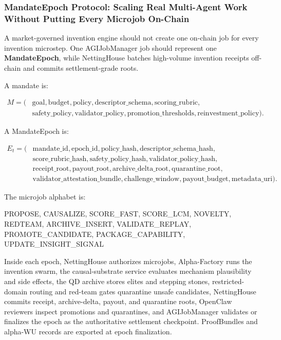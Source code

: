 \documentclass[
  11pt,
]{article}
\newenvironment{Shaded}{}{}
\newcommand{\NormalTok}[1]{#1}
\begin{document}
\subsubsection{MandateEpoch Protocol: Scaling Real Multi-Agent Work
Without Putting Every Microjob
On-Chain}\label{mandateepoch-protocol-scaling-real-multi-agent-work-without-putting-every-microjob-on-chain}

A market-governed invention engine should not create one on-chain job
for every invention microstep. One AGIJobManager job should represent
one \textbf{MandateEpoch}, while NettingHouse batches high-volume
invention receipts off-chain and commits settlement-grade roots.

A mandate is:

\[
\begin{aligned}
M = (&\mathrm{goal}, \mathrm{budget}, \mathrm{policy},
\mathrm{descriptor\_schema}, \mathrm{scoring\_rubric},\\
&\mathrm{safety\_policy}, \mathrm{validator\_policy},
\mathrm{promotion\_thresholds}, \mathrm{reinvestment\_policy}).
\end{aligned}
\]

A MandateEpoch is:

\[
\begin{aligned}
E_t = (&\mathrm{mandate\_id}, \mathrm{epoch\_id}, \mathrm{policy\_hash},
\mathrm{descriptor\_schema\_hash},\\
&\mathrm{score\_rubric\_hash}, \mathrm{safety\_policy\_hash},
\mathrm{validator\_policy\_hash},\\
&\mathrm{receipt\_root}, \mathrm{payout\_root},
\mathrm{archive\_delta\_root}, \mathrm{quarantine\_root},\\
&\mathrm{validator\_attestation\_bundle}, \mathrm{challenge\_window},
\mathrm{payout\_budget}, \mathrm{metadata\_uri}).
\end{aligned}
\]

The microjob alphabet is:

\begin{Shaded}
\begin{Highlighting}[]
\NormalTok{PROPOSE, CAUSALIZE, SCORE\_FAST, SCORE\_LCM, NOVELTY, REDTEAM,}
\NormalTok{ARCHIVE\_INSERT, VALIDATE\_REPLAY, PROMOTE\_CANDIDATE,}
\NormalTok{PACKAGE\_CAPABILITY, UPDATE\_INSIGHT\_SIGNAL}
\end{Highlighting}
\end{Shaded}

Inside each epoch, NettingHouse authorizes microjobs, Alpha-Factory runs
the invention swarm, the causal-substrate service evaluates mechanism
plausibility and side effects, the QD archive stores elites and stepping
stones, restricted-domain routing and red-team gates quarantine unsafe
candidates, NettingHouse commits receipt, archive-delta, payout, and
quarantine roots, OpenClaw reviewers inspect promotions and quarantines,
and AGIJobManager validates or finalizes the epoch as the authoritative
settlement checkpoint. ProofBundles and alpha-WU records are exported at
epoch finalization.
\end{document}
